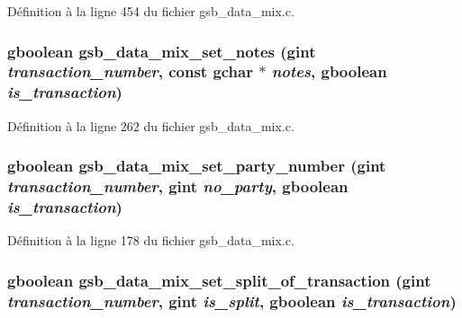 Définition à la ligne 454 du fichier gsb\_\-data\_\-mix.c.

\subsubsection[{gsb\_\-data\_\-mix\_\-set\_\-notes}]{\setlength{\rightskip}{0pt plus 5cm}gboolean gsb\_\-data\_\-mix\_\-set\_\-notes (gint {\em transaction\_\-number}, \/  const gchar $\ast$ {\em notes}, \/  gboolean {\em is\_\-transaction})}\label{gsb__data__mix_8c_ac86fbf196be1cfb41afdf1ab32436396}


Définition à la ligne 262 du fichier gsb\_\-data\_\-mix.c.

\subsubsection[{gsb\_\-data\_\-mix\_\-set\_\-party\_\-number}]{\setlength{\rightskip}{0pt plus 5cm}gboolean gsb\_\-data\_\-mix\_\-set\_\-party\_\-number (gint {\em transaction\_\-number}, \/  gint {\em no\_\-party}, \/  gboolean {\em is\_\-transaction})}\label{gsb__data__mix_8c_aaf3ff9d5cd9e6b540aca93e7b1bdf236}


Définition à la ligne 178 du fichier gsb\_\-data\_\-mix.c.

\subsubsection[{gsb\_\-data\_\-mix\_\-set\_\-split\_\-of\_\-transaction}]{\setlength{\rightskip}{0pt plus 5cm}gboolean gsb\_\-data\_\-mix\_\-set\_\-split\_\-of\_\-transaction (gint {\em transaction\_\-number}, \/  gint {\em is\_\-split}, \/  gboolean {\em is\_\-transaction})}\label{gsb__data__mix_8c_ac0d0557f4d82e2072a4059751c163ffa}


